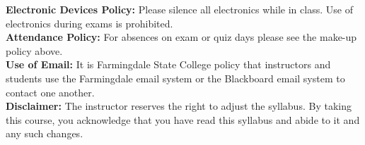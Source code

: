 \documentclass[11pt]{article}
\begin{document}
{\bf Electronic Devices Policy: }Please silence all electronics while in class. Use of electronics during exams is prohibited.\\

{\bf Attendance Policy: }For absences on exam or quiz days please see the make-up policy above. \\

{\bf Use of Email: }It is Farmingdale State College policy that instructors and students use the Farmingdale email system or the Blackboard email system to contact one another. \\

{\bf Disclaimer:} The instructor reserves the right to adjust the syllabus. By taking this course, you acknowledge that you have read this syllabus and abide
to it and any such changes.
% 
\end{document}
